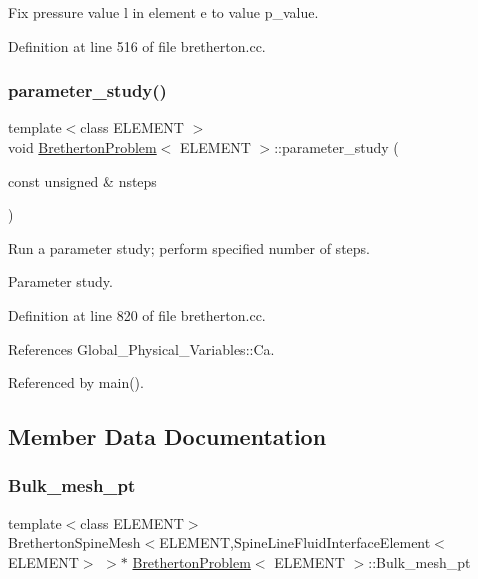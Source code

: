 Fix pressure value l in element e to value p\+\_\+value. 



Definition at line 516 of file bretherton.\+cc.

\mbox{\label{classBrethertonProblem_ac24db9373e1a3005e6b14fc92c16b41c}} 
\subsubsection{\texorpdfstring{parameter\+\_\+study()}{parameter\_study()}}
{\footnotesize\ttfamily template$<$class E\+L\+E\+M\+E\+NT $>$ \\
void \hyperlink{classBrethertonProblem}{Bretherton\+Problem}$<$ E\+L\+E\+M\+E\+NT $>$\+::parameter\+\_\+study (\begin{DoxyParamCaption}\item[{const unsigned \&}]{nsteps }\end{DoxyParamCaption})}



Run a parameter study; perform specified number of steps. 

Parameter study. 

Definition at line 820 of file bretherton.\+cc.



References Global\+\_\+\+Physical\+\_\+\+Variables\+::\+Ca.



Referenced by main().



\subsection{Member Data Documentation}
\mbox{\label{classBrethertonProblem_af293d72416de7a93ed51f20a5e4fb86e}} 
\subsubsection{\texorpdfstring{Bulk\+\_\+mesh\+\_\+pt}{Bulk\_mesh\_pt}}
{\footnotesize\ttfamily template$<$class E\+L\+E\+M\+E\+NT$>$ \\
Bretherton\+Spine\+Mesh$<$E\+L\+E\+M\+E\+NT,Spine\+Line\+Fluid\+Interface\+Element$<$E\+L\+E\+M\+E\+NT$>$ $>$$\ast$ \hyperlink{classBrethertonProblem}{Bretherton\+Problem}$<$ E\+L\+E\+M\+E\+NT $>$\+::Bulk\+\_\+mesh\+\_\+pt\hspace{0.3cm}{\ttfamily [private]}}



